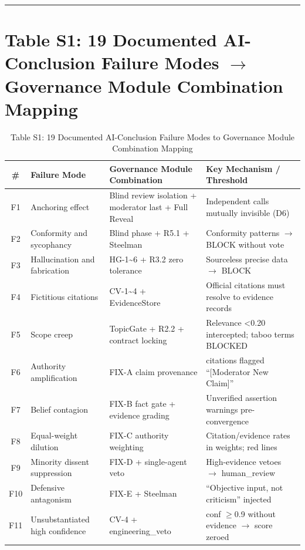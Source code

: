 \documentclass[11pt,a4paper]{article}
\begin{document}
\begin{center}\rule{0.5\linewidth}{0.5pt}\end{center}

\section*{Table S1: 19 Documented AI-Conclusion Failure Modes $\rightarrow$ Governance Module Combination Mapping}


\begin{table}[htbp]
\caption{Table S1: 19 Documented AI-Conclusion Failure Modes to Governance Module Combination Mapping}
\centering
\small
\begin{tabularx}{\textwidth}{c>{\raggedright\arraybackslash}p{4cm}>{\raggedright\arraybackslash}p{5cm}>{\raggedright\arraybackslash}X}
\toprule
\#
& Failure Mode
& Governance Module Combination
& Key Mechanism / Threshold
\\
\midrule
F1 & Anchoring effect & Blind review isolation + moderator last + Full Reveal & Independent calls mutually invisible (D6) \\
F2 & Conformity and sycophancy & Blind phase + R5.1 + Steelman & Conformity patterns $\rightarrow$ BLOCK without vote \\
F3 & Hallucination and fabrication & HG-1\textasciitilde6 + R3.2 zero tolerance & Sourceless precise data $\rightarrow$ BLOCK \\
F4 & Fictitious citations & CV-1\textasciitilde4 + EvidenceStore & Official citations must resolve to evidence records \\
F5 & Scope creep & TopicGate + R2.2 + contract locking & Relevance \textless0.20 intercepted; taboo terms BLOCKED \\
F6 & Authority amplification & FIX-A claim provenance & 0 citations flagged ``{[}Moderator New Claim{]}'' \\
F7 & Belief contagion & FIX-B fact gate + evidence grading & Unverified assertion warnings pre-convergence \\
F8 & Equal-weight dilution & FIX-C authority weighting & Citation/evidence rates in weights; red lines \\
F9 & Minority dissent suppression & FIX-D + single-agent veto & High-evidence vetoes $\rightarrow$ human\_review \\
F10 & Defensive antagonism & FIX-E + Steelman & ``Objective input, not criticism'' injected \\
F11 & Unsubstantiated high confidence & CV-4 + engineering\_veto & conf $\ge$0.9 without evidence $\rightarrow$ score zeroed \\

\end{tabularx}
\end{table}
\end{document}
